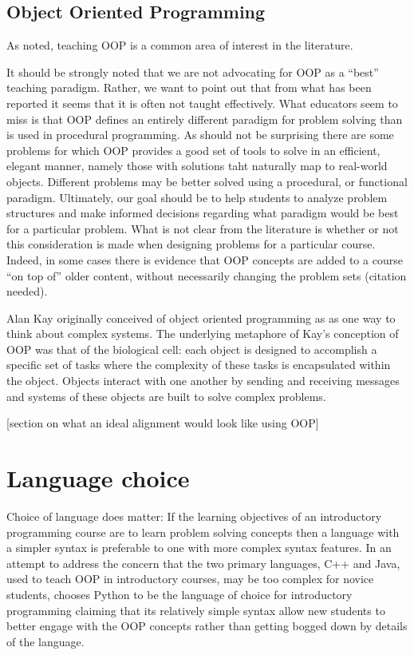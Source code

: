 \documentclass[12pt]{article}
\let\textcite=\autocite
\begin{document}
\subsection{Object Oriented Programming}
As noted, teaching OOP is a common area of interest in the literature. 

It should be strongly noted that we are not advocating for OOP as a
``best'' teaching paradigm. Rather, we want to point out that from what
has been reported it seems that it is often not taught
effectively. What educators seem to miss is that OOP defines an
entirely different paradigm for problem solving than is used in
procedural programming\autocite{kolling_problem_1999}. As should not
be surprising there are some problems for which OOP provides a good
set of tools to solve in an efficient, elegant manner, namely those
with solutions taht naturally map to real-world
objects\autocite{raymond_art_2003}. Different problems may be better
solved using a procedural, or functional
paradigm\autocite{kay_history_1996,felleisen_functional_2009,crestani_experience_2010}. Ultimately,
our goal should be to help students to analyze problem structures and
make informed decisions regarding what paradigm would be best for a
particular problem. What is not clear from the literature is whether
or not this consideration is made when designing problems for a
particular course. Indeed, in some cases there is evidence that OOP
concepts are added to a course ``on top of'' older content, without
necessarily changing the problem sets (citation needed).

Alan Kay originally conceived of object oriented programming as as one
way to think about complex systems\autocite{kay_history_1996}. The
underlying metaphore of Kay's conception of OOP was that of the
biological cell: each object is designed to accomplish a specific set
of tasks where the complexity of these tasks is encapsulated within
the object. Objects interact with one another by sending and receiving
messages and systems of these objects are built to solve complex
problems\autocite{kay_history_1996}.

[section on what an ideal alignment would look like using OOP]

\section{Language choice}
Choice of language does matter: If the learning objectives of an
introductory programming course are to learn problem solving concepts
then a language with a simpler syntax is preferable to one with more
complex syntax features\autocite{koulouri_teaching_2014}. In an
attempt to address the concern that the two primary languages, C++ and
Java, used to teach OOP in introductory courses, may be too complex
for novice students, \textcite{goldwasser_teaching_2008} chooses
Python to be the language of choice for introductory programming
claiming that its relatively simple syntax allow new students to
better engage with the OOP concepts rather than getting bogged down by
details of the language.
\end{document}
